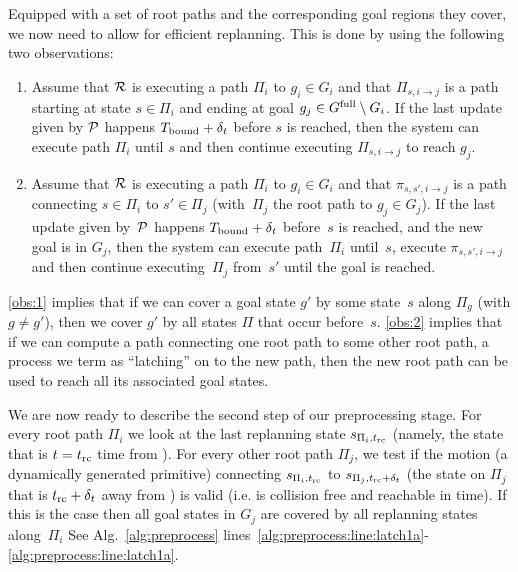 \documentclass[a4paper,10pt]{article}
\begin{document}

Equipped with a set of root paths and the corresponding goal regions they cover, we now need to allow for efficient replanning. This is done by using the following two observations:
\begin{enumerate}[label={\textbf{O\arabic*}},leftmargin=0.75cm]
    \item \label{obs:1} 
    Assume that $\mathcal{R}$ is executing a path $\Pi_i$ to $g_i \in G_i$ and that $\Pi_{s, i \rightarrow j}$ is a path starting at state $s \in \Pi_i$ and ending at goal $g_j \in G^{\textrm{full}} \setminus G_i$.
    If the last update given by $\mathcal{P}$ happens $T_{\textrm{bound}} + \delta_t$ before $s$ is reached,
    then the system can execute path $\Pi_i$ until $s$ and then continue executing $\Pi_{s, i \rightarrow j}$ to reach  $g_j$.

    \item \label{obs:2} 
    Assume that $\mathcal{R}$ is executing a path $\Pi_i$ to $g_i \in G_i$ and that $\pi_{s,s',i \rightarrow j}$ is a path connecting  $s \in \Pi_i$ to $s' \in \Pi_j$ (with~$\Pi_j$ the root path to $g_j \in G_j$).
    If the last update given by~$\mathcal{P}$ happens $T_{\textrm{bound}} + \delta_t$ before~$s$ is reached,
    and the new goal is in $G_j$,
    then the system can execute path~$\Pi_i$ until~$s$, execute $\pi_{s,s',i \rightarrow j}$ and then continue executing~$\Pi_{j}$ from~$s'$ until the goal is reached.

\end{enumerate}

%
\ref{obs:1} implies that if we can cover a goal state $g'$  by some state~$s$ along $\Pi_g$ (with $g \neq g'$), then we cover $g'$ by all states $\Pi$ that occur before~$s$.
%
\ref{obs:2} implies that if we can compute a path connecting one root path to some other root path, a process we term as ``latching'' on to the new path, then the new root path can be used to reach all its associated goal states.

We are now ready to describe the second step of our preprocessing stage.
%
For every root path $\Pi_i$ we look at the last replanning state $s_{\Pi_i, t_{\textrm{rc}}}$ (namely, the state that is $t=t_{\textrm{rc}}$ time from \Shome). For every other root path $\Pi_j$, we test if the motion (a dynamically generated primitive) connecting $s_{\Pi_i, t_{\textrm{rc}}}$ to $s_{\Pi_j, t_{\textrm{rc}} + \delta_t}$ (the state on $\Pi_j$ that is $t_{\textrm{rc}}+\delta_t$ away from \Shome) is valid (i.e. is collision free and reachable in time). 
%
If this is the case then all goal states in $G_j$ are covered by all replanning states along~$\Pi_i$
See Alg.~\ref{alg:preprocess} lines~\ref{alg:preprocess:line:latch1a}-\ref{alg:preprocess:line:latch1a}.
%
\end{document}
